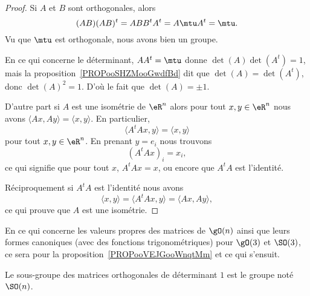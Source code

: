 \begin{proof}
	Si \( A\) et \( B\) sont orthogonales, alors
	\begin{equation}
		(AB)(AB)^t=ABB^tA^t=A\mtu A^t=\mtu.
	\end{equation}
	Vu que \( \mtu\) est orthogonale, nous avons bien un groupe.

	En ce qui concerne le déterminant, \( AA^t=\mtu\) donne \( \det(A)\det(A^t)=1\), mais la proposition~\ref{PROPooSHZMooGwdfBd} dit que \( \det(A)=\det(A^t)\), donc \( \det(A)^2=1\). D'où le fait que \( \det(A)=\pm 1\).

	D'autre part si \( A\) est une isométrie de \( \eR^n\) alors pour tout \( x,y\in \eR^n\) nous avons \( \langle Ax, Ay\rangle =\langle x, y\rangle \). En particulier,
	\begin{equation}
		\langle A^tAx, y\rangle =\langle x, y\rangle
	\end{equation}
	pour tout \( x,y\in \eR^n\). En prenant \( y=e_i\) nous trouvons
	\begin{equation}
		(A^tAx)_i=x_i,
	\end{equation}
	ce qui signifie que pour tout \( x\), \( A^tAx=x\), ou encore que \( A^tA\) est l'identité.

	Réciproquement si \( A^tA\) est l'identité nous avons
	\begin{equation}
		\langle x, y\rangle =\langle A^tAx, y\rangle =\langle Ax, Ay\rangle ,
	\end{equation}
	ce qui prouve que \( A\) est une isométrie.
\end{proof}

En ce qui concerne les valeurs propres des matrices de \( \gO(n)\) ainsi que leurs formes canoniques (avec des fonctions trigonométriques) pour \( \gO(3)\) et \( \SO(3)\), ce sera pour la proposition~\ref{PROPooVEJGooWnqtMm} et ce qui s'ensuit.

\begin{definition}      \label{DEFooJLNQooBKTYUy}
	Le sous-groupe des matrices orthogonales de déterminant \( 1\) est le groupe  noté \( \SO(n)\).
\end{definition}

